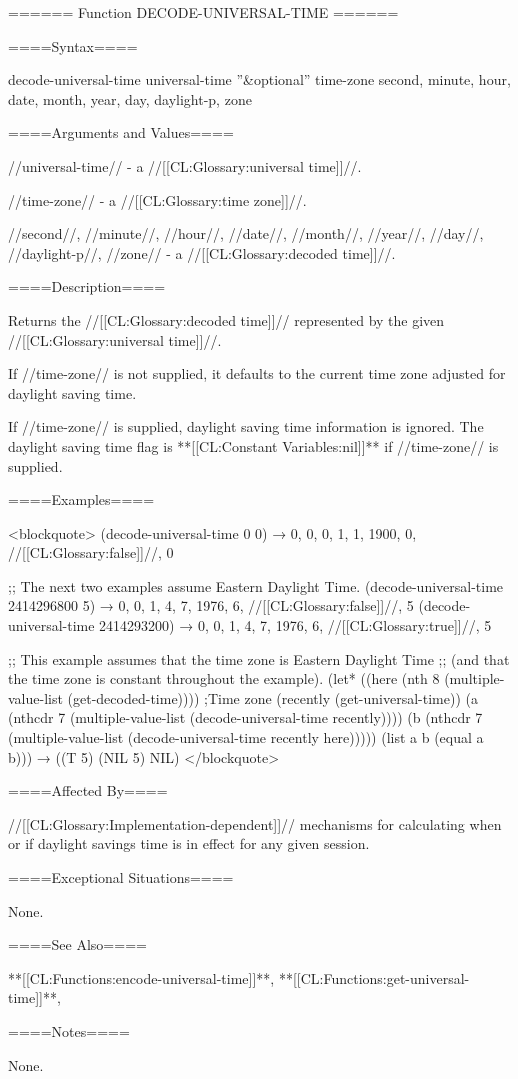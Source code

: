 ====== Function DECODE-UNIVERSAL-TIME ======

====Syntax====

\DefunWithValuesNewline decode-universal-time {universal-time ''&optional'' time-zone} {second, minute, hour, date, month, year, day, daylight-p, zone}

====Arguments and Values====

//universal-time// - a //[[CL:Glossary:universal time]]//.

//time-zone// - a //[[CL:Glossary:time zone]]//.

//second//, //minute//, //hour//, //date//, //month//, //year//, //day//, //daylight-p//, //zone// - a //[[CL:Glossary:decoded time]]//.

====Description====

Returns the //[[CL:Glossary:decoded time]]// represented by the given //[[CL:Glossary:universal time]]//.

If //time-zone// is not supplied, it defaults to the current time zone adjusted for daylight saving time.

If //time-zone// is supplied, daylight saving time information is ignored. The daylight saving time flag is **[[CL:Constant Variables:nil]]** if //time-zone// is supplied.

====Examples====

<blockquote> (decode-universal-time 0 0) → 0, 0, 0, 1, 1, 1900, 0, //[[CL:Glossary:false]]//, 0

;; The next two examples assume Eastern Daylight Time. (decode-universal-time 2414296800 5) → 0, 0, 1, 4, 7, 1976, 6, //[[CL:Glossary:false]]//, 5 (decode-universal-time 2414293200) → 0, 0, 1, 4, 7, 1976, 6, //[[CL:Glossary:true]]//, 5

;; This example assumes that the time zone is Eastern Daylight Time ;; (and that the time zone is constant throughout the example). (let* ((here (nth 8 (multiple-value-list (get-decoded-time)))) ;Time zone (recently (get-universal-time)) (a (nthcdr 7 (multiple-value-list (decode-universal-time recently)))) (b (nthcdr 7 (multiple-value-list (decode-universal-time recently here))))) (list a b (equal a b))) → ((T 5) (NIL 5) NIL) </blockquote>

====Affected By====

//[[CL:Glossary:Implementation-dependent]]// mechanisms for calculating when or if daylight savings time is in effect for any given session.

====Exceptional Situations====

None.

====See Also====

**[[CL:Functions:encode-universal-time]]**, **[[CL:Functions:get-universal-time]]**,

{\secref\Time}

====Notes====

None.

  
